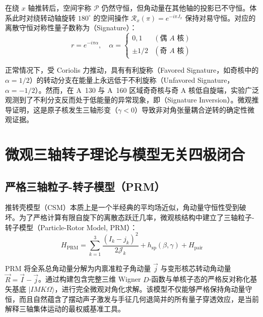 在绕 $x$ 轴推转后，空间宇称 $\mathcal{P}$ 仍然守恒，但角动量在其他轴的投影已不守恒。体系此时对绕转动轴旋转 $180^\circ$ 的空间操作 $\mathcal{R}_x(\pi) = e^{-i \pi J_x}$ 保持对易守恒。对应的离散守恒对称性量子数称为（Signature）：
\begin{equation}
    r = e^{-i \pi \alpha}, \quad \alpha = \begin{cases} 0, 1 & (\text{偶 } A \text{ 核}) \\ \pm 1/2 & (\text{奇 } A \text{ 核}) \end{cases}
\end{equation}

正常情况下，受 Coriolis 力推动，具有有利旋称（Favored Signature，如奇核中的 $\alpha = 1/2$）的转动分支在能量上永远低于不利旋称（Unfavored Signature，$\alpha = -1/2$）。然而，在 A~130 与 A~160 区域奇奇核与奇 A 核低自旋端，实验广泛观测到了不利分支反而处于低能量的异常现象，即（Signature Inversion）。微观推导证明，这是原子核发生三轴形变（$\gamma < 0$）导致非对角张量耦合逆转的确定性微观证据。

\section{微观三轴转子理论与模型无关四极闭合}
\label{sec:triaxial_theory_and_closure}

\subsection{严格三轴粒子-转子模型（PRM）}

推转壳模型（CSM）本质上是一个半经典的平均场近似，角动量守恒性受到破坏。为了严格计算有限自旋下的离散态跃迁几率，微观核结构中建立了三轴粒子-转子模型（Particle-Rotor Model, PRM）：
\begin{equation}
    H_{\text{PRM}} = \sum_{k=1}^3 \frac{(I_k - j_k)^2}{2\mathcal{J}_k} + h_{\text{sp}}(\beta, \gamma) + H_{\text{pair}}
    \label{eq:prm_hamiltonian}
\end{equation}

PRM 将全系总角动量分解为内禀准粒子角动量 $\vec{j}$ 与变形核芯转动角动量 $\vec{R} = \vec{I} - \vec{j}$。通过构建包含完整三维 Wigner $D$-函数与单核子态的严格反对称化基矢基底 $|I M K \Omega\rangle$，进行完全微观对角化求解。该模型不仅能够严格保持角动量守恒，而且自然蕴含了摆动声子激发与手征几何退简并的所有量子穿透效应，是当前解释三轴集体运动的最权威基准工具。


